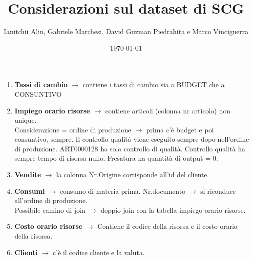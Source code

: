 \documentclass{article}
\title{Considerazioni sul dataset di SCG }
\author{Ianitchii Alin, Gabriele Marchesi, David Guzman Piedrahita e Marco Vinciguerra}
\date{\today}
\begin{document}
\maketitle
\begin{enumerate}
    \item \textbf{Tassi di cambio} $\rightarrow$ contiene i tassi di cambio sia a BUDGET che a CONSUNTIVO
    \item \textbf{Impiego orario risorse} $\rightarrow$ contiene articoli (colonna nr articolo) non unique. 
    \\Considerazione = ordine di produzione $\rightarrow$ prima c’è budget e poi consuntivo, sempre. Il controllo qualità viene eseguito sempre dopo nell’ordine di produzione. ART0000128 ha solo controllo di qualità.
    Controllo qualità ha sempre tempo di risorsa nullo. Fresatura ha quantità di output = 0.
    \item \textbf{Vendite} $\rightarrow$ la colonna Nr.Origine corrisponde all’id del cliente.
    \item \textbf{Consumi} $\rightarrow$ consumo di materia prima. Nr.documento $\rightarrow$ si riconduce all’ordine di produzione.
    \\Possibile camino di join $\rightarrow$ doppio join con la tabella impiego orario risorse.
    \item \textbf{Costo orario risorse} $\rightarrow$ Contiene il codice della risorsa e il costo orario della risorsa.
    \item \textbf{Clienti} $\rightarrow$ c’è il codice cliente e la valuta.
\end{enumerate}
\end{document}

